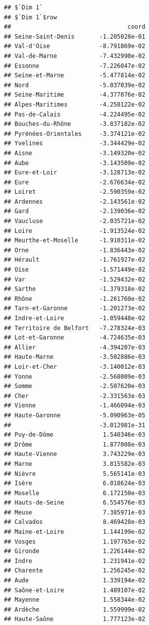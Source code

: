 \documentclass[]{book}
\begin{document}
\begin{verbatim}
## $`Dim 1`
## $`Dim 1`$row
##                                 coord
## Seine-Saint-Denis       -1.205028e-01
## Val-d'Oise              -8.791869e-02
## Val-de-Marne            -7.432990e-02
## Essonne                 -7.226047e-02
## Seine-et-Marne          -5.477814e-02
## Nord                    -5.037039e-02
## Seine-Maritime          -4.377076e-02
## Alpes-Maritimes         -4.250122e-02
## Pas-de-Calais           -4.224495e-02
## Bouches-du-Rhône        -3.837182e-02
## Pyrénées-Orientales     -3.374121e-02
## Yvelines                -3.344429e-02
## Aisne                   -3.149320e-02
## Aube                    -3.143509e-02
## Eure-et-Loir            -3.128713e-02
## Eure                    -2.676634e-02
## Loiret                  -2.590359e-02
## Ardennes                -2.143561e-02
## Gard                    -2.139036e-02
## Vaucluse                -2.035721e-02
## Loire                   -1.913524e-02
## Meurthe-et-Moselle      -1.910311e-02
## Orne                    -1.836443e-02
## Hérault                 -1.761927e-02
## Oise                    -1.571449e-02
## Var                     -1.529432e-02
## Sarthe                  -1.379318e-02
## Rhône                   -1.261760e-02
## Tarn-et-Garonne         -1.201273e-02
## Indre-et-Loire          -1.059448e-02
## Territoire de Belfort   -7.278324e-03
## Lot-et-Garonne          -4.724635e-03
## Allier                  -4.394207e-03
## Haute-Marne             -3.502886e-03
## Loir-et-Cher            -3.140012e-03
## Yonne                   -2.568009e-03
## Somme                   -2.507620e-03
## Cher                    -2.331563e-03
## Vienne                  -1.466094e-03
## Haute-Garonne           -5.090963e-05
##                         -3.012981e-31
## Puy-de-Dôme              1.540346e-03
## Drôme                    1.877008e-03
## Haute-Vienne             3.743229e-03
## Marne                    3.815582e-03
## Nièvre                   5.565141e-03
## Isère                    6.018624e-03
## Moselle                  6.172150e-03
## Hauts-de-Seine           6.554576e-03
## Meuse                    7.385971e-03
## Calvados                 8.469428e-03
## Maine-et-Loire           1.144199e-02
## Vosges                   1.197765e-02
## Gironde                  1.226144e-02
## Indre                    1.231941e-02
## Charente                 1.256245e-02
## Aude                     1.339194e-02
## Saône-et-Loire           1.489107e-02
## Mayenne                  1.558344e-02
## Ardèche                  1.559999e-02
## Haute-Saône              1.777123e-02

\end{verbatim}
\end{document}
